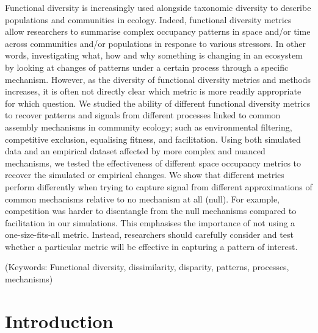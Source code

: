 \documentclass[12pt,letterpaper]{article}
\begin{document}
Functional diversity is increasingly used alongside taxonomic diversity to describe populations and communities in ecology.
Indeed, functional diversity metrics allow researchers to summarise complex occupancy patterns in space and/or time across communities and/or populations in response to various stressors.
In other words, investigating what, how and why something is changing in an ecosystem by looking at changes of patterns under a certain process through a specific mechanism.
However, as the diversity of functional diversity metrics and methods increases, it is often not directly clear which metric is more readily appropriate for which question.
We studied the ability of different functional diversity metrics to recover patterns and signals from different processes linked to common assembly mechanisms in community ecology; such as environmental filtering, competitive exclusion, equalising fitness, and facilitation.
Using both simulated data and an empirical dataset affected by more complex and nuanced mechanisms, we tested the effectiveness of different space occupancy metrics to recover the simulated or empirical changes.
We show that different metrics perform differently when trying to capture signal from different approximations of common mechanisms relative to no mechanism at all (null).
For example, competition was harder to disentangle from the null mechanisms compared to facilitation in our simulations.
This emphasises the importance of not using a one-size-fits-all metric.
Instead, researchers should carefully consider and test whether a particular metric will be effective in capturing a pattern of interest.

\noindent (Keywords: Functional diversity, dissimilarity, disparity, patterns, processes, mechanisms)\\

\newpage

\section{Introduction}
\end{document}
